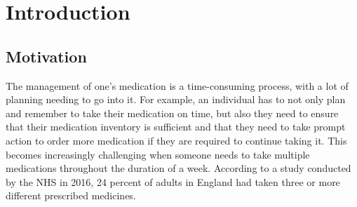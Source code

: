 \documentclass{l4proj}
\begin{document}
%
%
%
%
%
%
%
%
\chapter{Introduction}


\section{Motivation}

The management of one's medication is a time-consuming process, with a lot of planning needing to go into it. For example, an individual has to not only plan and remember to take their medication on time, but also they need to ensure that their medication inventory is sufficient and that they need to take prompt action to order more medication if they are required to continue taking it. This becomes increasingly challenging when someone needs to take multiple medications throughout the duration of a week. According to a study conducted by the NHS in 2016, 24 percent of adults in England had taken three or more different prescribed medicines. 
\end{document}
